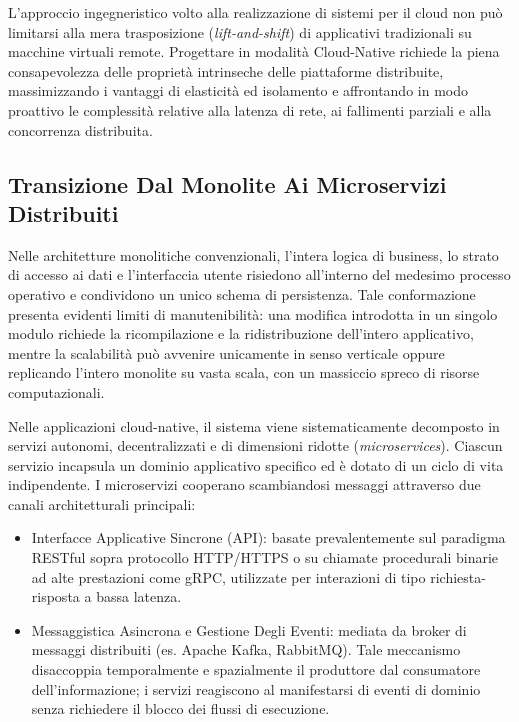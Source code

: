 \documentclass[11pt, a4paper]{article}
\begin{document}
L'approccio ingegneristico volto alla realizzazione di sistemi per il cloud non può limitarsi alla mera trasposizione (\emph{lift-and-shift}) di applicativi tradizionali su macchine virtuali remote. Progettare in modalità Cloud-Native richiede la piena consapevolezza delle proprietà intrinseche delle piattaforme distribuite, massimizzando i vantaggi di elasticità ed isolamento e affrontando in modo proattivo le complessità relative alla latenza di rete, ai fallimenti parziali e alla concorrenza distribuita.

\subsection{Transizione Dal Monolite Ai Microservizi Distribuiti}

Nelle architetture monolitiche convenzionali, l'intera logica di business, lo strato di accesso ai dati e l'interfaccia utente risiedono all'interno del medesimo processo operativo e condividono un unico schema di persistenza. Tale conformazione presenta evidenti limiti di manutenibilità: una modifica introdotta in un singolo modulo richiede la ricompilazione e la ridistribuzione dell'intero applicativo, mentre la scalabilità può avvenire unicamente in senso verticale oppure replicando l'intero monolite su vasta scala, con un massiccio spreco di risorse computazionali.

Nelle applicazioni cloud-native, il sistema viene sistematicamente decomposto in servizi autonomi, decentralizzati e di dimensioni ridotte (\emph{microservices}). Ciascun servizio incapsula un dominio applicativo specifico ed è dotato di un ciclo di vita indipendente. I microservizi cooperano scambiandosi messaggi attraverso due canali architetturali principali:
\begin{itemize}[noitemsep]
    \item Interfacce Applicative Sincrone (API): basate prevalentemente sul paradigma RESTful sopra protocollo HTTP/HTTPS o su chiamate procedurali binarie ad alte prestazioni come gRPC, utilizzate per interazioni di tipo richiesta-risposta a bassa latenza.
    \item Messaggistica Asincrona e Gestione Degli Eventi: mediata da broker di messaggi distribuiti (es. Apache Kafka, RabbitMQ). Tale meccanismo disaccoppia temporalmente e spazialmente il produttore dal consumatore dell'informazione; i servizi reagiscono al manifestarsi di eventi di dominio senza richiedere il blocco dei flussi di esecuzione.
\end{itemize}
\end{document}
